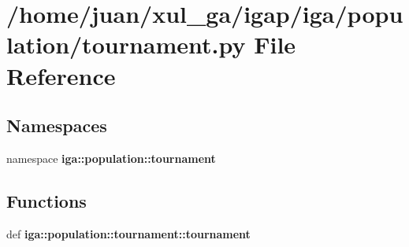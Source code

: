 \section{/home/juan/xul\_\-ga/igap/iga/population/tournament.py File Reference}
\label{tournament_8py}
\subsection*{Namespaces}
\begin{CompactItemize}
\item 
namespace {\bf iga::population::tournament}
\end{CompactItemize}
\subsection*{Functions}
\begin{CompactItemize}
\item 
def {\bf iga::population::tournament::tournament}
\end{CompactItemize}
